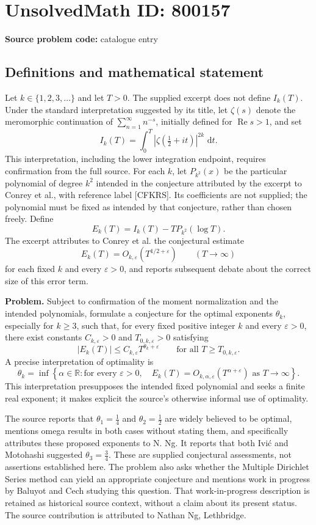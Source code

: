 \documentclass[11pt]{article}
\newcommand{\R}{\mathbb{R}}
\newcommand{\dd}{\,\mathrm{d}}
\begin{document}
\section*{UnsolvedMath ID: 800157}
\textbf{Source problem code:} catalogue entry
\subsection{Definitions and mathematical statement}
Let \(k\in\{1,2,3,\ldots\}\) and let \(T>0\). The supplied excerpt does not define \(I_k(T)\). Under the standard interpretation suggested by its title, let \(\zeta(s)\) denote the meromorphic continuation of \(\sum_{n=1}^{\infty}n^{-s}\), initially defined for \(\operatorname{Re}s>1\), and set
\[
I_k(T)=\int_0^T\left|\zeta\!\left(\tfrac12+it\right)\right|^{2k}\,\dd t.
\]
This interpretation, including the lower integration endpoint, requires confirmation from the full source. For each \(k\), let \(P_{k^2}(x)\) be the particular polynomial of degree \(k^2\) intended in the conjecture attributed by the excerpt to Conrey et al., with reference label [CFKRS]. Its coefficients are not supplied; the polynomial must be fixed as intended by that conjecture, rather than chosen freely. Define
\[
E_k(T)=I_k(T)-T P_{k^2}(\log T).
\]
The excerpt attributes to Conrey et al. the conjectural estimate
\[
E_k(T)=O_{k,\varepsilon}\!\left(T^{1/2+\varepsilon}\right)
\qquad(T\to\infty)
\]
for each fixed \(k\) and every \(\varepsilon>0\), and reports subsequent debate about the correct size of this error term.

\textbf{Problem.} Subject to confirmation of the moment normalization and the intended polynomials, formulate a conjecture for the optimal exponents \(\theta_k\), especially for \(k\geq3\), such that, for every fixed positive integer \(k\) and every \(\varepsilon>0\), there exist constants \(C_{k,\varepsilon}>0\) and \(T_{0,k,\varepsilon}>0\) satisfying
\[
|E_k(T)|\leq C_{k,\varepsilon}T^{\theta_k+\varepsilon}
\qquad\text{for all }T\geq T_{0,k,\varepsilon}.
\]
A precise interpretation of optimality is
\[
\theta_k=\inf\left\{\alpha\in\R:
\text{for every }\varepsilon>0,\quad
E_k(T)=O_{k,\alpha,\varepsilon}\!\left(T^{\alpha+\varepsilon}\right)
\text{ as }T\to\infty\right\}.
\]
This interpretation presupposes the intended fixed polynomial and seeks a finite real exponent; it makes explicit the source's otherwise informal use of optimality.

The source reports that \(\theta_1=\tfrac14\) and \(\theta_2=\tfrac12\) are widely believed to be optimal, mentions omega results in both cases without stating them, and specifically attributes these proposed exponents to N. Ng. It reports that both Ivi\'c and Motohashi suggested \(\theta_3=\tfrac34\). These are supplied conjectural assessments, not assertions established here. The problem also asks whether the Multiple Dirichlet Series method can yield an appropriate conjecture and mentions work in progress by Baluyot and Cech studying this question. That work-in-progress description is retained as historical source context, without a claim about its present status. The source contribution is attributed to Nathan Ng, Lethbridge.
\end{document}
